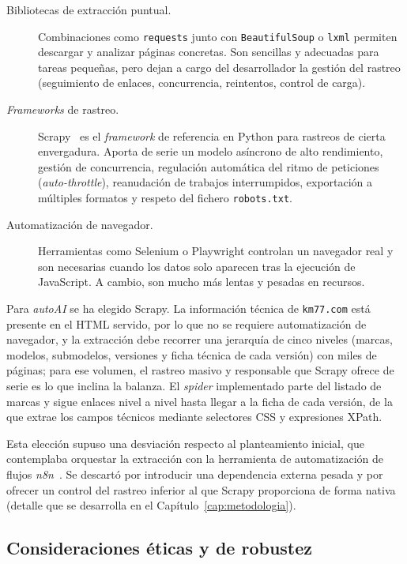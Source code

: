 \begin{description}
  \item[Bibliotecas de extracción puntual.] Combinaciones como \texttt{requests}
        junto con \texttt{BeautifulSoup} o \texttt{lxml} permiten descargar y
        analizar páginas concretas. Son sencillas y adecuadas para tareas
        pequeñas, pero dejan a cargo del desarrollador la gestión del rastreo
        (seguimiento de enlaces, concurrencia, reintentos, control de carga).

  \item[\emph{Frameworks} de rastreo.] Scrapy~\cite{scrapy2024} es el \emph{framework} de referencia
        en Python para rastreos de cierta envergadura. Aporta de serie un modelo
        asíncrono de alto rendimiento, gestión de concurrencia, regulación
        automática del ritmo de peticiones (\emph{auto-throttle}), reanudación de
        trabajos interrumpidos, exportación a múltiples formatos y respeto del
        fichero \texttt{robots.txt}.

  \item[Automatización de navegador.] Herramientas como Selenium o Playwright
        controlan un navegador real y son necesarias cuando los datos solo
        aparecen tras la ejecución de JavaScript. A cambio, son mucho más lentas y
        pesadas en recursos.
\end{description}

Para \emph{autoAI} se ha elegido Scrapy. La información técnica de
\texttt{km77.com} está presente en el HTML servido, por lo que no se requiere
automatización de navegador, y la extracción debe recorrer una jerarquía de cinco
niveles (marcas, modelos, submodelos, versiones y ficha técnica de cada versión)
con miles de páginas; para ese volumen, el rastreo masivo y responsable que Scrapy
ofrece de serie es lo que inclina la balanza. El \emph{spider} implementado parte
del listado de marcas y sigue enlaces nivel a nivel hasta llegar a la ficha de cada
versión, de la que extrae los campos técnicos mediante selectores CSS y expresiones
XPath.

Esta elección supuso una desviación respecto al planteamiento inicial, que
contemplaba orquestar la extracción con la herramienta de automatización de flujos
\emph{n8n}~\cite{n8n2024}. Se descartó por introducir una dependencia externa pesada y por ofrecer
un control del rastreo inferior al que Scrapy proporciona de forma nativa (detalle
que se desarrolla en el Capítulo~\ref{cap:metodologia}).

\subsection{Consideraciones éticas y de robustez}

